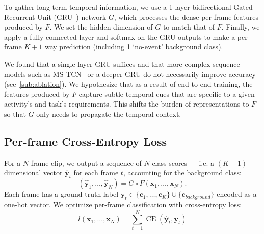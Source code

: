 \documentclass[runningheads]{llncs}
\newcommand{\notation}[1]{\ensuremath{#1}\xspace}
\newcommand{\NumFrames}{\notation{N}}
\newcommand{\NumClasses}{\notation{K}}
\newcommand{\Time}{\notation{t}}
\newcommand{\Frame}[1]{\notation{\mathbf{x}_{#1}}}
\newcommand{\Class}[1]{\notation{\mathbf{c}_{#1}}}
\newcommand{\Label}[1]{\notation{\mathbf{y}_{#1}}}
\newcommand{\Prediction}[1]{\notation{\hat{\mathbf{y}}_{#1}}}
\newcommand{\AllFrames}{\notation{\Frame{1},\ldots,\Frame{\NumFrames}}}
\newcommand{\AllClasses}{\notation{\Class{1},\ldots,\Class{\NumClasses}}}
\newcommand{\AllPredictions}{\notation{\Prediction{1},\ldots,\Prediction{\NumFrames}}}
\DeclareMathOperator{\CE}{CE}
\newcommand{\FeatureExtractor}{\notation{F}}
\newcommand{\TemporalArchitecture}{\notation{G}}
\begin{document}
To gather long-term temporal information, we use a 1-layer bidirectional Gated
Recurrent Unit (GRU~\cite{gatedrnn}) network $\TemporalArchitecture$, which
processes the dense per-frame features produced by $\FeatureExtractor$.
We set the hidden dimension of $\TemporalArchitecture$ to match that of $\FeatureExtractor$.
Finally, we apply a fully connected layer and softmax on the GRU outputs to make a per-frame $\NumClasses + 1$ way prediction (including 1 `no-event' background class).

We found that a single-layer GRU suffices and that more complex sequence models
such as MS-TCN~\cite{mstcn} or a deeper GRU do not necessarily improve accuracy
(see~\autoref{sub:ablation}).
We hypothesize that as a result of end-to-end training,
the features produced by $\FeatureExtractor$ capture subtle temporal cues
that are specific to a given activity's and task's requirements.
This shifts the burden of representations to \FeatureExtractor so
that \TemporalArchitecture only needs to propagate the temporal context.

\subsection{Per-frame Cross-Entropy Loss}
\label{sub:losses}

For a \NumFrames-frame clip, we output a sequence of \NumFrames class scores ---
i.e. a $(\NumClasses + 1)$-dimensional vector \Prediction{\Time} for each frame \Time, accounting for the background class:
\begin{equation}
    (\AllPredictions) = \TemporalArchitecture \circ \FeatureExtractor( \AllFrames ).
\end{equation}
Each frame has a ground-truth label $\Label{t} \in \{\AllClasses\} \cup \{ \Class{background} \}$ encoded as a one-hot vector.
We optimize per-frame classification with cross-entropy loss:
\begin{equation}
    l(\AllFrames) = \sum_{t=1}^{\NumFrames} \CE(\Prediction{t}, \Label{t})
    \label{eq:loss}
\end{equation}
\end{document}

